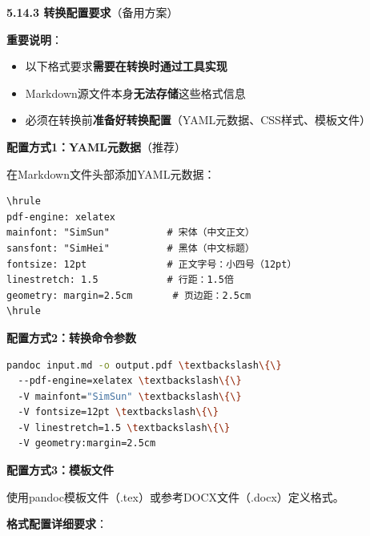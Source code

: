 \documentclass[12pt,a4paper]{article}
\numberwithin{equation}{section}  %
\begin{document}
\textbf{5.14.3 转换配置要求}（备用方案）

\textbf{重要说明}：
\begin{itemize}
\item [警告] 以下格式要求\textbf{需要在转换时通过工具实现}
\item [警告] Markdown源文件本身\textbf{无法存储}这些格式信息
\item [正确] 必须在转换前\textbf{准备好转换配置}（YAML元数据、CSS样式、模板文件）
\end{itemize}

\textbf{配置方式1：YAML元数据}（推荐）

在Markdown文件头部添加YAML元数据：

\begin{verbatim}
\hrule
pdf-engine: xelatex
mainfont: "SimSun"          # 宋体（中文正文）
sansfont: "SimHei"          # 黑体（中文标题）
fontsize: 12pt              # 正文字号：小四号（12pt）
linestretch: 1.5            # 行距：1.5倍
geometry: margin=2.5cm       # 页边距：2.5cm
\hrule
\end{verbatim}

\textbf{配置方式2：转换命令参数}

\begin{lstlisting}[language=bash]
pandoc input.md -o output.pdf \textbackslash\{\}
  --pdf-engine=xelatex \textbackslash\{\}
  -V mainfont="SimSun" \textbackslash\{\}
  -V fontsize=12pt \textbackslash\{\}
  -V linestretch=1.5 \textbackslash\{\}
  -V geometry:margin=2.5cm
\end{lstlisting}

\textbf{配置方式3：模板文件}

使用pandoc模板文件（.tex）或参考DOCX文件（.docx）定义格式。

\textbf{格式配置详细要求}：
\end{document}
